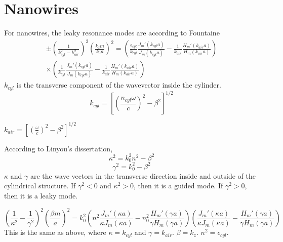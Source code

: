\documentclass[12pt]{article}
\date{\today }
\author{
Paul W. Leu\\
University of Pittsburgh\\
Pittsburgh, PA}
\numberwithin{equation}{section}
\begin{document}
\tableofcontents

\section{Nanowires}

For nanowires, the leaky resonance modes are according to Fountaine \cite{Fountaine:14}
\begin{equation}
\begin{aligned}
\pm \left ( \frac{1}{k_{cyl}^2 - k_{air}^2} \right ) ^2 \left ( \frac{k_z m}{k_0 a} \right )^2 = \left ( \frac{\epsilon_{cyl}}{k_{cyl}} \frac{J_m' (k_{cyl} a )}{J_m (k_{cyl} a )} - \frac{1}{k_{air}} \frac{H_m' (k_{air} a)}{H_m (k_{air} a )} \right ) 
\\ \times 
\left ( \frac{1}{k_{cyl}} \frac{J_m' (k_{cyl} a )}{J_m (k_{cyl} a )} - \frac{1}{k_{air}} \frac{H_m' (k_{air} a)}{H_m (k_{air} a )} \right ) 
\end{aligned}
\end{equation}
$k_{cyl}$ is the transverse component of the wavevector inside the cylinder.  
\begin{equation}
k_{cyl} = \left [ \left ( \frac{n_{cyl} \omega}{c} \right )^2 - \beta^2 \right ]^{1/2}
\end{equation}

$k_{air} = \left [ \left ( \frac{\omega}{c} \right )^2 -  \beta^2 \right ]^{1/2}$



According to Linyou's dissertation, 
\begin{equation}
\kappa^2 = k_0^2 n^2 - \beta^2
\end{equation}
\begin{equation}
\gamma^2 = k_0^2 - \beta^2
\end{equation}
$\kappa$ and $\gamma$ are the wave vectors in the transverse direction inside and outside of the cylindrical structure.  
If $\gamma^2 < 0$ and $\kappa^2 > 0$, then it is a guided mode.  
If $\gamma^2 > 0$, then it is a leaky mode.  

\begin{equation}
\left ( \frac{1}{\kappa^2} - \frac{1}{\gamma^2} \right ) ^2 \left ( \frac{\beta m}{a} \right )^2
= k_0^2 \left ( n^2 \frac{J_m' (\kappa a )}{\kappa J_m (\kappa a )} - n_0^2 \frac{H_m' (\gamma a)}{\gamma H_m (\gamma a )}   \right )
\left ( \frac{J_m' (\kappa a )}{\kappa J_m (\kappa a )} - \frac{H_m' (\gamma a)}{\gamma H_m (\gamma a )}   \right )
\end{equation}
This is the same as above, where
$\kappa = k_{cyl}$ and $\gamma = k_{air}$.
$\beta = k_z$. 
$n^2 = \epsilon_{cyl}$. 
\end{document}
